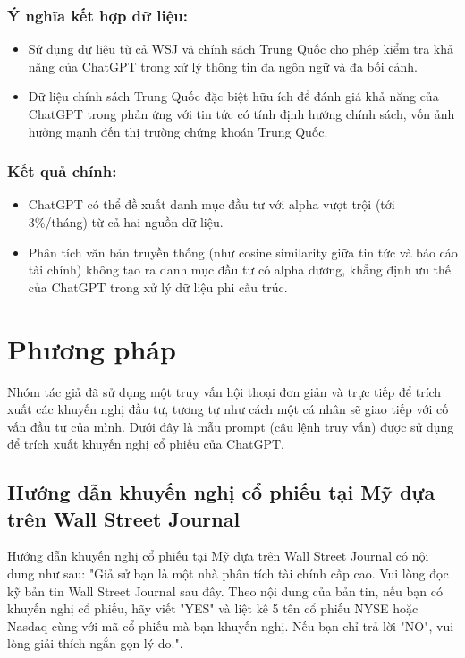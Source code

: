 \documentclass[a4paper,12pt]{article}
\begin{document}
\noindent
\subsubsection{{Ý nghĩa kết hợp dữ liệu:}}
\begin{itemize}
    \item Sử dụng dữ liệu từ cả WSJ và chính sách Trung Quốc cho phép kiểm tra khả năng của ChatGPT trong xử lý thông tin đa ngôn ngữ và đa bối cảnh.
    \item Dữ liệu chính sách Trung Quốc đặc biệt hữu ích để đánh giá khả năng của ChatGPT trong phản ứng với tin tức có tính định hướng chính sách, vốn ảnh hưởng mạnh đến thị trường chứng khoán Trung Quốc.
\end{itemize}

\noindent
\subsubsection{{Kết quả chính:}}
\begin{itemize}
    \item ChatGPT có thể đề xuất danh mục đầu tư với alpha vượt trội (tới 3\%/tháng) từ cả hai nguồn dữ liệu.
    \item Phân tích văn bản truyền thống (như cosine similarity giữa tin tức và báo cáo tài chính) không tạo ra danh mục đầu tư có alpha dương, khẳng định ưu thế của ChatGPT trong xử lý dữ liệu phi cấu trúc.
\end{itemize}
\section{Phương pháp}
Nhóm tác giả đã sử dụng một truy vấn hội thoại đơn giản và trực tiếp để trích xuất các khuyến nghị đầu tư, tương tự như cách một cá nhân sẽ giao tiếp với cố vấn đầu tư của mình. Dưới đây là mẫu prompt (câu lệnh truy vấn) được sử dụng để trích xuất khuyến nghị cổ phiếu của ChatGPT.


\subsection{Hướng dẫn khuyến nghị cổ phiếu tại Mỹ dựa trên Wall Street Journal}
Hướng dẫn khuyến nghị cổ phiếu tại Mỹ dựa trên Wall Street Journal có nội dung như sau: "Giả sử bạn là một nhà phân tích tài chính cấp cao. Vui lòng đọc kỹ bản tin Wall Street Journal sau đây. Theo nội dung của bản tin, nếu bạn có khuyến nghị cổ phiếu, hãy viết "YES" và liệt kê 5 tên cổ phiếu NYSE hoặc Nasdaq cùng với mã cổ phiếu mà bạn khuyến nghị. Nếu bạn chỉ trả lời "NO", vui lòng giải thích ngắn gọn lý do.".
\end{document}
